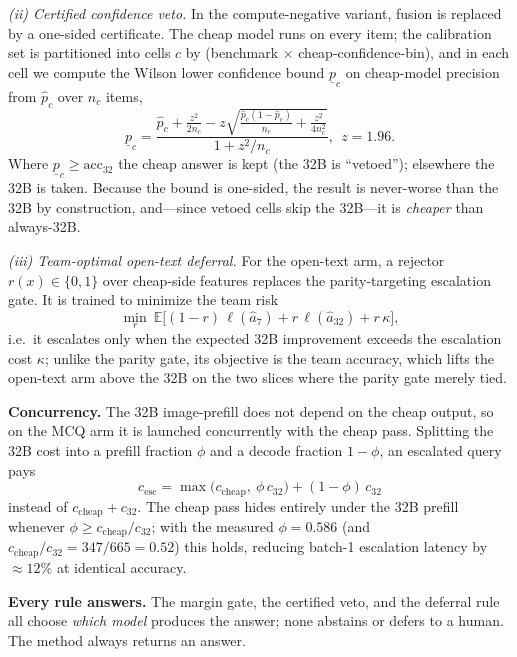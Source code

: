 \documentclass[conference]{IEEEtran}
\begin{document}
\emph{(ii) Certified confidence veto.} In the compute-negative variant, fusion is replaced by a one-sided certificate. The cheap model runs on every item; the calibration set is partitioned into cells $c$ by (benchmark $\times$ cheap-confidence-bin), and in each cell we compute the Wilson lower confidence bound $\underline{p}_c$ on cheap-model precision from $\hat p_c$ over $n_c$ items,
\begin{equation}
\underline{p}_c=\frac{\hat p_c+\frac{z^2}{2n_c}-z\sqrt{\tfrac{\hat p_c(1-\hat p_c)}{n_c}+\tfrac{z^2}{4n_c^2}}}{1+z^2/n_c},\ \ z{=}1.96. \label{eq:wilson}
\end{equation}
Where $\underline{p}_c \ge \mathrm{acc}_{32}$ the cheap answer is kept (the 32B is ``vetoed''); elsewhere the 32B is taken. Because the bound is one-sided, the result is never-worse than the 32B by construction, and---since vetoed cells skip the 32B---it is \emph{cheaper} than always-32B.

\emph{(iii) Team-optimal open-text deferral.} For the open-text arm, a rejector $r(x)\in\{0,1\}$ over cheap-side features replaces the parity-targeting escalation gate. It is trained to minimize the team risk
\begin{equation}
\min_{r}\ \mathbb{E}\big[(1-r)\,\ell(\hat a_{7}) + r\,\ell(\hat a_{32}) + r\,\kappa\big], \label{eq:l2d}
\end{equation}
i.e.\ it escalates only when the expected 32B improvement exceeds the escalation cost $\kappa$; unlike the parity gate, its objective is the team accuracy, which lifts the open-text arm above the 32B on the two slices where the parity gate merely tied.

\textbf{Concurrency.} The 32B image-prefill does not depend on the cheap output, so on the MCQ arm it is launched concurrently with the cheap pass. Splitting the 32B cost into a prefill fraction $\phi$ and a decode fraction $1{-}\phi$, an escalated query pays
\begin{equation}
c_{\text{esc}} = \max\!\big(c_{\text{cheap}},\ \phi\,c_{32}\big) + (1{-}\phi)\,c_{32} \label{eq:concurrency}
\end{equation}
instead of $c_{\text{cheap}}+c_{32}$. The cheap pass hides entirely under the 32B prefill whenever $\phi \ge c_{\text{cheap}}/c_{32}$; with the measured $\phi{=}0.586$ (and $c_{\text{cheap}}/c_{32}=347/665=0.52$) this holds, reducing batch-1 escalation latency by ${\approx}12\%$ at identical accuracy.

\textbf{Every rule answers.} The margin gate, the certified veto, and the deferral rule all choose \emph{which model} produces the answer; none abstains or defers to a human. The method always returns an answer.
\end{document}
